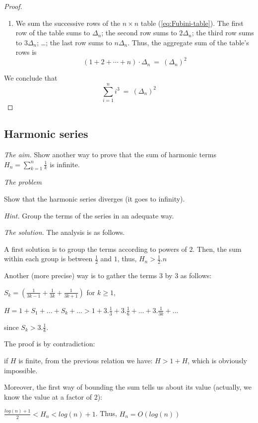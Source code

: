 \begin{proof}
\begin{enumerate}
\item
We sum the successive rows of the $n \times n$ table (\ref{eq:Fubini-table}).  
The first row of the table sums to $\Delta_n$; the second row sums to $2
\Delta_n$; the third row sums to $3 \Delta_n$; \ldots; the last row sums
to $n \Delta_n$.  
Thus, the aggregate sum of the table's rows is 
\[ (1 + 2 + \cdots + n) \cdot \Delta_n \ = \ \left(\Delta_n \right)^2 \]
\end{enumerate}
We conclude that
\[
\sum_{i=1}^n i^3 \ = \  \left(\Delta_n \right)^2
\]
\end{proof}


\subsection{Harmonic series}

\noindent \textit{The aim.}
Show another way to prove that the sum of harmonic terms $H_{n} = \sum_{k=1}^{n} \frac{1}{k}$ is infinite.
\medskip

\noindent \textit{The problem}

Show that the harmonic series diverges (it goes to infinity).
\medskip

\noindent \textit{Hint.}
Group the terms of the series in an adequate way.
\medskip

 \noindent \textit{The solution.}
The analysis is as follows.

A first solution is to group the terms according to powers of $2$. 
Then, the sum within each group is between $\frac{1}{2}$ and $1$, thus,
$H_n > \frac{1}{2}.n$
\medskip

Another (more precise) way is to gather the terms 3 by 3 as follows:

$S_k = (\frac{1}{3k-1} + \frac{1}{3k} + \frac{1}{3k+1} )$ for $k\geq1$, 

$H = 1 + S_1 + ... + S_k + ... > 1 + 3.\frac{1}{3} + 3.\frac{1}{6} + ... + 3.\frac{1}{3k} + ... $

since $S_k > 3.\frac{1}{k} $.

The proof is by contradiction:

if $H$ is finite, from the previous relation we have: $H > 1 + H$, which is obviously impossible.
\medskip

Moreover, the first way of  bounding the sum tells us about its value (actually, we know the value at a factor of $2$):

$\frac{log(n)+1}{2} < H_n < log(n)+1$. Thus, $H_n = O(log(n))$




